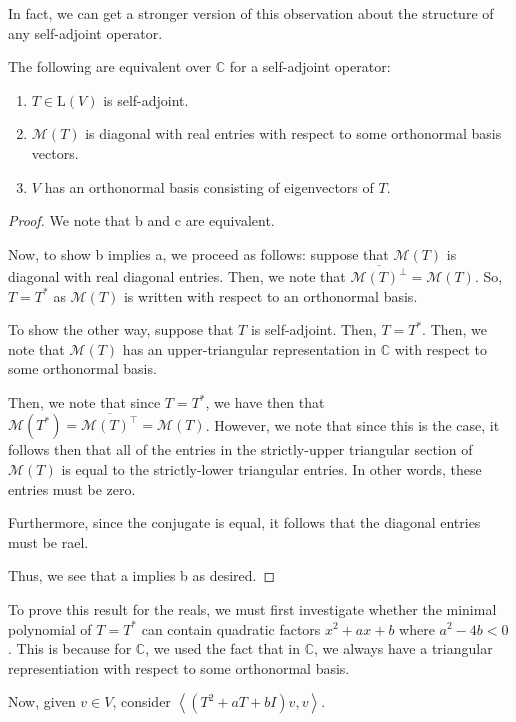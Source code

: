 \documentclass[openany]{book}
\newcommand{\CC}{\mathbb{C}}
\newcommand{\innerproduct}[2]{\left\langle{#1}, {#2}\right\rangle}
\begin{document}
In fact, we can get a stronger version of this observation about the structure of any self-adjoint operator. 
\begin{thm}
	The following are equivalent over $\CC$ for a self-adjoint operator:
	\begin{enumerate}
		\item $T \in \mathrm{L}(V)$ is self-adjoint.
		\item $\mathcal{M}(T)$ is diagonal with real entries with respect to some orthonormal basis vectors.
		\item $V$ has an orthonormal basis consisting of eigenvectors of $T$.
	\end{enumerate}
\end{thm}
\begin{proof}
	We note that b and c are equivalent.
	
	Now, to show b implies a, we proceed as follows: suppose that $\mathcal{M}(T)$ is diagonal with real diagonal entries. Then, we note that $\overline{\mathcal{M}(T)^{\perp}} = \mathcal{M}(T)$. So, $T = T^{*}$ as $\mathcal{M}(T)$ is written with respect to an orthonormal basis.
	
	To show the other way, suppose that $T$ is self-adjoint. Then, $T = T^{*}$. Then, we note that $\mathcal{M}(T)$ has an upper-triangular representation in $\CC$ with respect to some orthonormal basis.
	
	Then, we note that since $T = T^{*}$, we have then that $\mathcal{M}(T^{*}) = \overline{\mathcal{M}(T)^{\intercal}}= \mathcal{M}(T)$. However, we note that since this is the case, it follows then that all of the entries in the strictly-upper triangular section of $\mathcal{M}(T)$ is equal to the strictly-lower triangular entries. In other words, these entries must be zero.
	
	Furthermore, since the conjugate is equal, it follows that the diagonal entries must be rael.
	
	Thus, we see that a implies b as desired.
\end{proof}

To prove this result for the reals, we must first investigate whether the minimal polynomial of $T = T^{*}$ can contain quadratic factors $x^{2} + ax + b$ where $a^2 - 4b < 0$. This is because for $\CC$, we used the fact that in $\CC$, we always have a triangular representiation with respect to some orthonormal basis.

Now, given $v \in V$, consider $\innerproduct{(T^{2} + aT + bI)v}{v}$.
 
\end{document}
